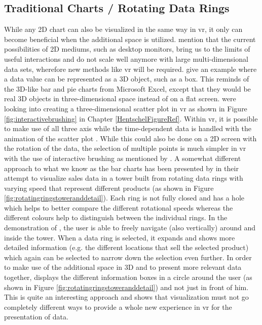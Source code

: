 
\subsection{Traditional Charts / Rotating Data Rings}

\label{SubSectionRotatingDataRings}

While any 2D chart can also be visualized in the same way in \gls{vr}, it only can become beneficial when the additional space is utilized. \cite{Jamieson2007} mention that the current possibilities of 2D mediums, such as desktop monitors, bring us to the limits of useful interactions and do not scale well anymore with large multi-dimensional data sets, wherefore new methods like \gls{vr} will be required. \cite{Jamieson2007} give an example where a data value can be represented as a 3D object, such as a box. This reminds of the 3D-like bar and pie charts from Microsoft Excel, except that they would be real 3D objects in three-dimensional space instead of on a flat screen. \cite{Hentschel2009} were looking into creating a three-dimensional scatter plot in \gls{vr} as shown in Figure \ref{fig:interactivebrushing} in Chapter \ref{HentschelFigureRef}. Within \gls{vr}, it is possible to make use of all three axis while the time-dependent data is handled with the animation of the scatter plot \citep{Hentschel2009}. While this could also be done on a 2D screen with the rotation of the data, the selection of multiple points is much simpler in \gls{vr} with the use of interactive brushing as mentioned by \cite{Hentschel2009}. \newline
A somewhat different approach to what we know as the bar charts has been presented by \cite{CodeScience2015} in their attempt to visualize sales data in a tower built from rotating data rings with varying speed that represent different products (as shown in Figure \ref{fig:rotatingringstoweranddetail}). Each ring is not fully closed and has a hole which helps to better compare the different rotational speeds whereas the different colours help to distinguish between the individual rings. In the demonstration of \cite{CodeScience2015}, the user is able to freely navigate (also vertically) around and inside the tower. When a data ring is selected, it expands and shows more detailed information (e.g. the different locations that sell the selected product) which again can be selected to narrow down the selection even further. In order to make use of the additional space in 3D and to present more relevant data together, \cite{CodeScience2015} displays the different information boxes in a circle around the user (as shown in Figure \ref{fig:rotatingringstoweranddetail}) and not just in front of him. This is quite an interesting approach and shows that visualization must not go completely different ways to provide a whole new experience in \gls{vr} for the presentation of data.
